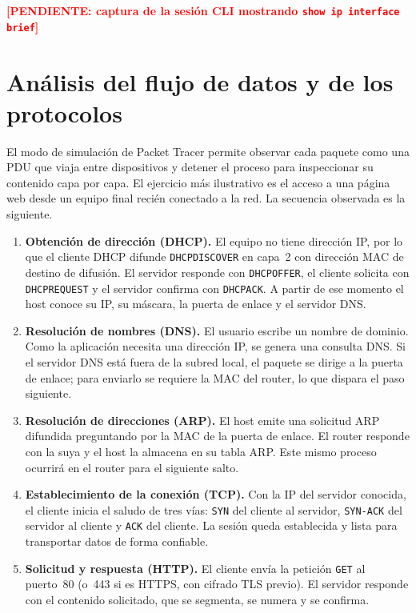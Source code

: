 \documentclass[11pt,a4paper]{article}
\newcommand{\pendiente}[1]{\textcolor{red}{\textbf{[PENDIENTE: #1]}}}
\begin{document}
\pendiente{captura de la sesión CLI mostrando \texttt{show ip interface brief}}

\section{Análisis del flujo de datos y de los protocolos}

El modo de simulación de Packet Tracer permite observar cada paquete como una
PDU que viaja entre dispositivos y detener el proceso para inspeccionar su
contenido capa por capa. El ejercicio más ilustrativo es el acceso a una página
web desde un equipo final recién conectado a la red. La secuencia observada es
la siguiente.

\begin{enumerate}[leftmargin=*]
  \item \textbf{Obtención de dirección (DHCP).} El equipo no tiene dirección
        IP, por lo que el cliente DHCP difunde \texttt{DHCPDISCOVER} en
        capa~2 con dirección MAC de destino de difusión. El servidor responde
        con \texttt{DHCPOFFER}, el cliente solicita con \texttt{DHCPREQUEST} y
        el servidor confirma con \texttt{DHCPACK}. A partir de ese momento el
        host conoce su IP, su máscara, la puerta de enlace y el servidor DNS.
  \item \textbf{Resolución de nombres (DNS).} El usuario escribe un nombre de
        dominio. Como la aplicación necesita una dirección IP, se genera una
        consulta DNS. Si el servidor DNS está fuera de la subred local, el
        paquete se dirige a la puerta de enlace; para enviarlo se requiere la
        MAC del router, lo que dispara el paso siguiente.
  \item \textbf{Resolución de direcciones (ARP).} El host emite una solicitud
        ARP difundida preguntando por la MAC de la puerta de enlace. El router
        responde con la suya y el host la almacena en su tabla ARP. Este mismo
        proceso ocurrirá en el router para el siguiente salto.
  \item \textbf{Establecimiento de la conexión (TCP).} Con la IP del servidor
        conocida, el cliente inicia el saludo de tres vías: \texttt{SYN} del
        cliente al servidor, \texttt{SYN-ACK} del servidor al cliente y
        \texttt{ACK} del cliente. La sesión queda establecida y lista para
        transportar datos de forma confiable.
  \item \textbf{Solicitud y respuesta (HTTP).} El cliente envía la petición
        \texttt{GET} al puerto~80 (o~443 si es HTTPS, con cifrado TLS
        previo). El servidor responde con el contenido solicitado, que se
        segmenta, se numera y se confirma.
\end{enumerate}
\end{document}
